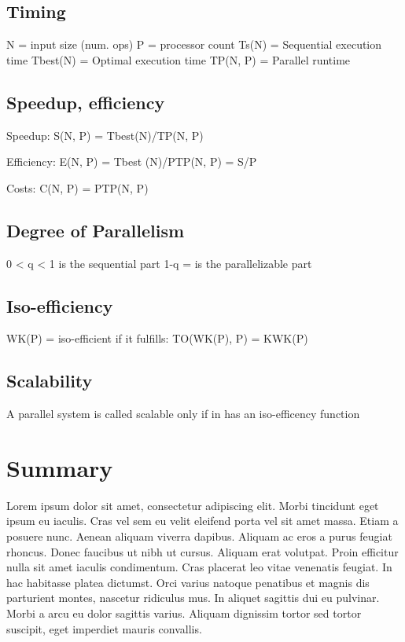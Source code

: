 \subsection{Timing}
	N = input size (num. ops)
	P = processor count
	Ts(N) = Sequential execution time
	Tbest(N) = Optimal execution time
	TP(N, P) = Parallel runtime
%
\subsection{Speedup, efficiency}
	Speedup:
S(N, P) = Tbest(N)/TP(N, P)

	Efficiency:
E(N, P) = Tbest (N)/PTP(N, P) = S/P

	Costs:
C(N, P) = PTP(N, P)
%
\subsection{Degree of Parallelism}
	0 < q < 1 is the sequential part
	1-q = is the parallelizable part
%
\subsection{Iso-efficiency}
	WK(P) = iso-efficient if it fulfills:
	TO(WK(P), P) = KWK(P)~\cite[p.~350]{Lang17}
%
\subsection{Scalability}
	A parallel system is called scalable only if in has an iso-efficency function
%
%
%
%
%
\section{Summary}
Lorem ipsum dolor sit amet, consectetur adipiscing elit. Morbi tincidunt eget
ipsum eu iaculis. Cras vel sem eu velit eleifend porta vel sit amet massa. Etiam
a posuere nunc. Aenean aliquam viverra dapibus. Aliquam ac eros a purus feugiat
rhoncus. Donec faucibus ut nibh ut cursus. Aliquam erat volutpat. Proin efficitur
nulla sit amet iaculis condimentum. Cras placerat leo vitae venenatis feugiat. In
hac habitasse platea dictumst. Orci varius natoque penatibus et magnis dis
parturient montes, nascetur ridiculus mus. In aliquet sagittis dui eu pulvinar.
Morbi a arcu eu dolor sagittis varius. Aliquam dignissim tortor sed tortor
suscipit, eget imperdiet mauris convallis.

